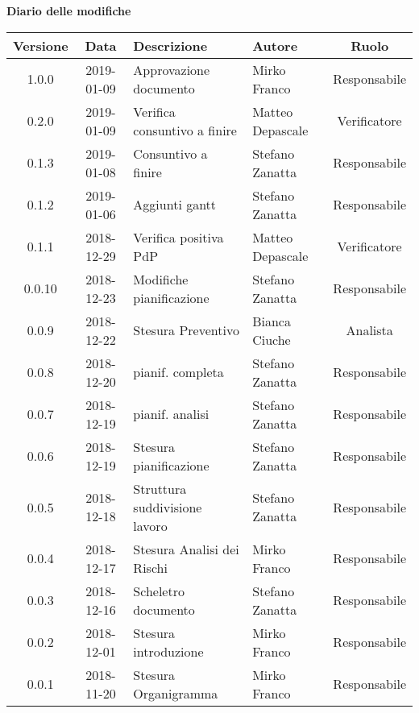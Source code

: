 	\begin{center}
		\textbf{Diario delle modifiche}
	\end{center}
	\begin{center}
		\begin{tabularx}{\textwidth}{|c|c|X|X|c|}
			\hline
			\textbf{Versione} & \textbf{Data} & \textbf{Descrizione} & \textbf{Autore} & \textbf{Ruolo} \\
			\hline
			1.0.0 & 2019-01-09 & Approvazione documento & Mirko Franco & Responsabile\\
			\hline
			0.2.0 & 2019-01-09 & Verifica consuntivo a finire & Matteo Depascale & Verificatore\\
			\hline
			0.1.3 & 2019-01-08 & Consuntivo a finire & Stefano Zanatta & Responsabile\\
			\hline
			0.1.2 & 2019-01-06 & Aggiunti gantt & Stefano Zanatta & Responsabile\\
			\hline
			0.1.1 & 2018-12-29 & Verifica positiva PdP & Matteo Depascale & Verificatore\\
			\hline
			0.0.10 & 2018-12-23 & Modifiche pianificazione & Stefano Zanatta & Responsabile\\
			\hline
			0.0.9 & 2018-12-22 & Stesura Preventivo & Bianca Ciuche & Analista\\
			\hline
			0.0.8 & 2018-12-20 & pianif. completa& Stefano Zanatta & Responsabile\\
			\hline
			0.0.7 & 2018-12-19 & pianif. analisi& Stefano Zanatta & Responsabile\\
			\hline
			0.0.6 & 2018-12-19 & Stesura pianificazione & Stefano Zanatta & Responsabile\\
			\hline
			0.0.5 & 2018-12-18 & Struttura suddivisione lavoro & Stefano Zanatta & Responsabile\\
			\hline
			0.0.4 & 2018-12-17 & Stesura Analisi dei Rischi & Mirko Franco & Responsabile\\
			\hline
			0.0.3 & 2018-12-16 & Scheletro documento &Stefano Zanatta & Responsabile\\
			\hline
			0.0.2 & 2018-12-01 & Stesura introduzione & Mirko Franco & Responsabile\\
			\hline
			0.0.1 & 2018-11-20 & Stesura Organigramma & Mirko Franco & Responsabile\\			
			\hline
			
		\end{tabularx}
	\end{center}
\newpage